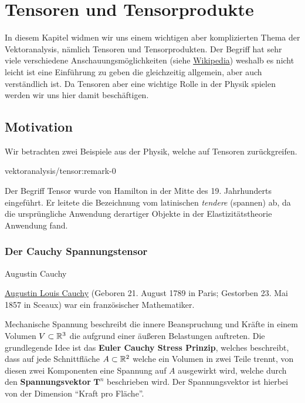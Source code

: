 \section{Tensoren und Tensorprodukte}
\label{\detokenize{vektoranalysis/tensor:tensoren-und-tensorprodukte}}\label{\detokenize{vektoranalysis/tensor::doc}}
\par
In diesem Kapitel widmen wir uns einem wichtigen aber komplizierten Thema der Vektoranalysis, nämlich Tensoren und Tensorprodukten.
Der Begriff hat sehr viele verschiedene Anschauungsmöglichkeiten (siehe \href{https://de.wikipedia.org/wiki/Tensorprodukt}{Wikipedia}) weshalb es nicht leicht ist eine Einführung zu geben die gleichzeitig allgemein, aber auch verständlich ist. Da Tensoren aber eine wichtige Rolle in der Physik spielen werden wir uns hier damit beschäftigen.


\subsection{Motivation}
\label{\detokenize{vektoranalysis/tensor:motivation}}
\par
Wir betrachten zwei Beispiele aus der Physik, welche auf Tensoren zurückgreifen.
\begin{remark}{}{vektoranalysis/tensor:remark-0}



\par
Der Begriff Tensor wurde von Hamilton in der Mitte des 19. Jahrhunderts eingeführt. Er leitete die Bezeichnung vom latinischen \emph{tendere} (spannen) ab, da die ursprüngliche Anwendung derartiger Objekte in der Elastizitätstheorie Anwendung fand.
\end{remark}


\subsubsection{Der Cauchy Spannungstensor}
\label{\detokenize{vektoranalysis/tensor:der-cauchy-spannungstensor}}
\begin{emphBox}{Augustin Cauchy}{}

\par
\href{https://de.wikipedia.org/wiki/Augustin-Louis\_Cauchy}{Augustin Louis Cauchy} (Geboren 21. August 1789 in Paris; Gestorben 23. Mai 1857 in Sceaux) war ein französischer Mathematiker.
\end{emphBox}

\par
Mechanische Spannung beschreibt die innere Beanspruchung und Kräfte in einem Volumen \(V\subset\mathbb{R}^3\) die aufgrund einer äußeren Belastungen auftreten. Die grundlegende Idee ist das \textbf{Euler Cauchy Stress Prinzip}, welches beschreibt, dass auf jede Schnittfläche \(A\subset\mathbb{R}^2\) welche ein Volumen in zwei Teile trennt, von diesen zwei Komponenten eine Spannung auf \(A\) ausgewirkt wird, welche durch den \textbf{Spannungsvektor} \(\mathbf{T}^n\) beschrieben wird. Der Spannungsvektor ist hierbei von der Dimension “Kraft pro Fläche”.

